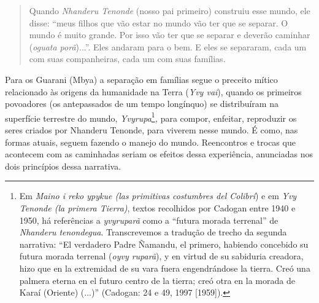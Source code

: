\begin{quote}
Quando \emph{Nhanderu Tenonde} (nosso pai primeiro) construiu esse
mundo, ele disse: ``meus filhos que vão estar no mundo vão ter que se
separar. O mundo é muito grande. Por isso vão ter que se separar e
deverão caminhar (\emph{oguata porã})...''. Eles andaram para o bem. E
eles se separaram, cada um com suas companheiras, cada um com suas
famílias.
\end{quote}

Para os Guarani (Mbya) a separação em famílias segue o preceito mítico
relacionado às origens da humanidade na Terra (\emph{Yvy vai}), quando
os primeiros povoadores (os antepassados de um tempo longínquo) se
distribuíram na superfície terrestre do mundo, \emph{Yvyrupa}\footnote{Em
  \emph{Maino i reko ypykue (las primitivas costumbres del Colibrí}) e
  em \emph{Yvy Tenonde (la primera Tierra)}, textos recolhidos por
  Cadogan entre 1940 e 1950, há referências a \emph{yvyruparã} como a
  ``futura morada terrenal'' de \emph{Nhanderu tenondegua}.
  Transcrevemos a tradução de trecho da segunda narrativa: ``El
  verdadero Padre Ñamandu, el primero, habiendo concebido su futura
  morada terrenal (\emph{oyvy ruparã}), y en virtud de su sabiduria
  creadora, hizo que en la extremidad de su vara fuera engendrándose la
  tierra. Creó una palmera eterna en el futuro centro de la tierra; creó
  otra en la morada de Karaí (Oriente) (...)'' (Cadogan: 24 e 49, 1997
  {[}1959{]}).}\emph{,} para compor, enfeitar, reproduzir os seres
criados por Nhanderu Tenonde, para viverem nesse mundo. É como, nas
formas atuais, seguem fazendo o manejo do mundo. Reencontros e trocas
que acontecem com as caminhadas seriam os efeitos dessa experiência,
anunciadas nos dois princípios dessa narrativa.

